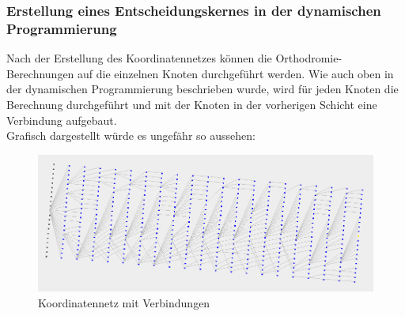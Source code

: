 \subsubsection{Erstellung eines Entscheidungskernes in der dynamischen Programmierung}
Nach der Erstellung des Koordinatennetzes können die Orthodromie-Berechnungen auf die einzelnen Knoten durchgeführt werden. Wie auch oben in der dynamischen Programmierung beschrieben wurde, wird für jeden Knoten die Berechnung durchgeführt und mit der Knoten in der vorherigen Schicht eine Verbindung aufgebaut. \\
Grafisch dargestellt würde es ungefähr so aussehen:
\begin{figure}[h!]
\centering
\includegraphics[width=1\linewidth]{img/gridNet_connections}
\caption{Koordinatennetz mit Verbindungen}
\label{gridnetConn}
\end{figure}


